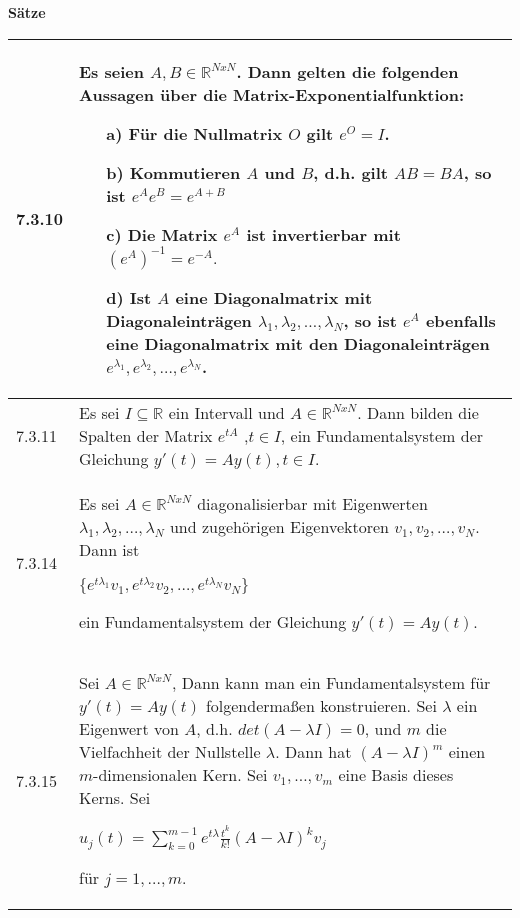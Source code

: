     \noindent 
    \textbf{Sätze}
    \begin{table}[H]
    \begin{tabularx}{\textwidth}{X m{16cm}}
        \toprule

        7.3.10& Es seien $A,B \in \mathbb{R}^{NxN}$. Dann gelten die folgenden Aussagen über die Matrix-Exponentialfunktion:
                \begin{itemize}[topsep=-0.5cm]
                    \item[a)] Für die Nullmatrix $O$ gilt $e^O = I$.
                    \item[b)] Kommutieren $A$ und $B$, d.h. gilt $AB = BA$, so ist $e^Ae^B = e^{A+B}$
                    \item[c)] Die Matrix $e^A$ ist invertierbar mit $(e^A)^{-1} = e^{-A}.$
                    \item[d)] Ist $A$ eine Diagonalmatrix mit Diagonaleinträgen $\lambda_1,\lambda_2, \dots,\lambda_N$, so ist
                                $e^A$ ebenfalls eine Diagonalmatrix mit den Diagonaleinträgen $e^{\lambda_1},e^{\lambda_2},\dots,e^{\lambda_N}$.
                \end{itemize} \vspace{-0cm} \\
        \midrule
        7.3.11& Es sei $I \subseteq \mathbb{R}$ ein Intervall und $A \in \mathbb{R}^{NxN}$. Dann bilden die Spalten der Matrix $e^{tA}$
                ,$t\in I$, ein Fundamentalsystem der Gleichung $y'(t) = Ay(t), t\in I$. \\
        \midrule
        7.3.14& Es sei $A \in \mathbb{R}^{NxN}$ diagonalisierbar mit Eigenwerten $\lambda_1, \lambda_2, \dots, \lambda_N$ und zugehörigen
                Eigenvektoren $v_1, v_2, \dots, v_N$. Dann ist \hfill \break
                \centerline{$ \{e^{t \lambda_1}v_1, e^{t \lambda_2}v_2, \dots, e^{t\lambda_N}v_N\} $}
                ein Fundamentalsystem der Gleichung $y'(t) = Ay(t).$ \\
        \midrule
        7.3.15& Sei $A \in \mathbb{R}^{NxN}$, Dann kann man ein Fundamentalsystem für $y'(t) = Ay(t)$ folgendermaßen konstruieren. Sei 
                $\lambda$ ein Eigenwert von $A$, d.h. $det(A-\lambda I) = 0$, und $m$ die Vielfachheit der Nullstelle $\lambda$. Dann hat
                $(A- \lambda I)^m$ einen $m$-dimensionalen Kern. Sei $v_1,\dots, v_m$ eine Basis dieses Kerns. Sei \hfill \break
                \centerline{$ u_j(t) = \sum_{k=0}^{m-1} e^{t\lambda}  \frac{t^k}{k!} (A- \lambda I)^k v_j$}
                für $j = 1, \dots, m$. \hfill \break

\end{tabularx}
\end{table}
